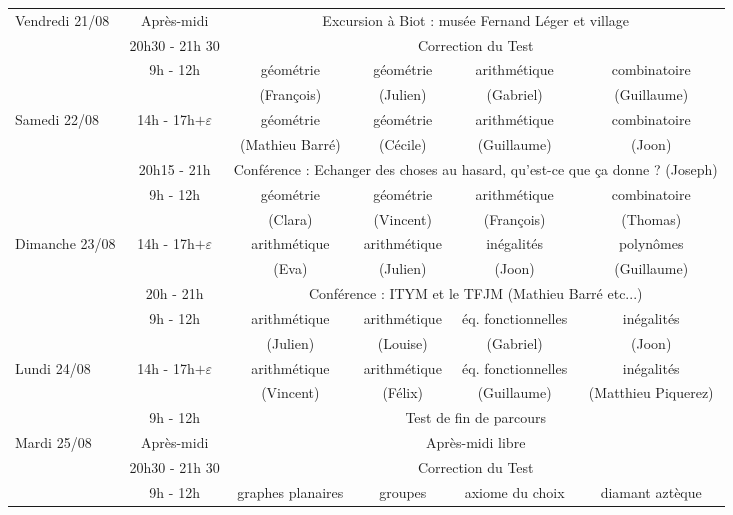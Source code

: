 \begin{center}
{\begin{tabular}{|l|c|c|c|c|c|}
\cline{2-6}
\small{Vendredi 21/08} & Après-midi & \multicolumn{4}{c|}{Excursion à Biot : musée Fernand Léger et village} \\
\cline{2-6}
& 20h30 - 21h 30 & \multicolumn{4}{c|}{Correction du Test} \\
\cline{2-6}
\hline
& 9h - 12h & géométrie & géométrie & arithmétique & combinatoire\\
&& (François) & (Julien) & (Gabriel) & (Guillaume) \\
\cline{2-6}
\small{ Samedi 22/08} & 14h - 17h$+ \varepsilon$ & géométrie & géométrie & arithmétique & combinatoire\\
&& (Mathieu Barré) & (Cécile)  & (Guillaume) & (Joon) \\
\cline{2-6}
& 20h15 - 21h & \multicolumn{4}{c|}{Conférence : Echanger des choses au hasard, qu'est-ce que ça donne ? (Joseph)} \\
\hline
& 9h - 12h & géométrie & géométrie & arithmétique & combinatoire \\
& &  (Clara) &  (Vincent) & (François)  & (Thomas)\\
\cline{2-6}
\small{Dimanche 23/08 } & 14h - 17h$+ \varepsilon$ & arithmétique & arithmétique & inégalités & polynômes \\
& &  (Eva) &  (Julien) & (Joon)  & (Guillaume)\\
\cline{2-6}
& 20h - 21h & \multicolumn{4}{c|}{Conférence : ITYM et le TFJM (Mathieu Barré etc...)} \\
\hline
& 9h - 12h & arithmétique & arithmétique & éq. fonctionnelles & inégalités \\
& &  (Julien) &  (Louise) & (Gabriel)  & (Joon)\\
\cline{2-6}
\small{Lundi 24/08} & 14h - 17h$+ \varepsilon$ & arithmétique & arithmétique & éq. fonctionnelles & inégalités \\
& &  (Vincent) &  (Félix) & (Guillaume)  & (Matthieu Piquerez)\\
\hline
& 9h - 12h & \multicolumn{4}{c|}{Test de fin de parcours} \\
\cline{2-6}
\small{Mardi 25/08} & Après-midi & \multicolumn{4}{c|}{Après-midi libre} \\
\cline{2-6}
& 20h30 - 21h 30 & \multicolumn{4}{c|}{Correction du Test} \\
\cline{2-6}
\hline
& 9h - 12h & graphes planaires & groupes & axiome du choix & diamant aztèque \\

\end{tabular}}
\end{center}
